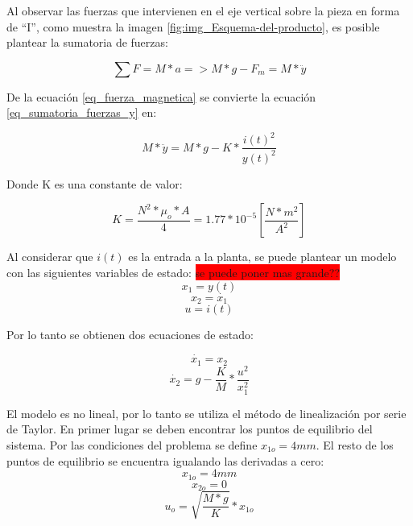 \noindent Al observar las fuerzas que intervienen en el eje vertical sobre la pieza en forma de ``I'', como muestra la imagen \ref{fig:img_Esquema-del-producto}, es posible plantear la sumatoria de fuerzas:

\begin{equation}\label{eq_sumatoria_fuerzas_y}
	\sum F=M*a=>M*g-F_{m}=M*\ddot{y}
\end{equation}

\noindent De la ecuación \ref{eq_fuerza_magnetica} se convierte la ecuación \ref{eq_sumatoria_fuerzas_y} en:

\begin{equation}\label{eq_sumatoria_fuerzas_y_2}
	M*\ddot{y}=M*g-K*\frac{i(t)^{2}}{y(t)^{2}}
\end{equation}

\noindent Donde K es una constante de valor:

\begin{equation}
	K=\frac{N^{2}*\mu_{o}*A}{4}=1.77*10^{-5} [\frac{N*m^2}{A^2}]
\end{equation}

\noindent Al considerar que $i(t)$ es la entrada a la planta, se puede plantear un modelo con las siguientes variables de estado:\newline
\colorbox{red}{se puede poner mas grande??}
\begin{equation}
	x_{1}=y(t)
\end{equation}
\begin{equation}
	x_{2}=\dot{x_{1}}
\end{equation}
\begin{equation}
	u=i(t)
\end{equation}

\noindent Por lo tanto se obtienen dos ecuaciones de estado:

\begin{equation}
	\dot{x_{1}}=x_{2}
\end{equation}
\begin{equation}
	\dot{x_{2}}=g-\frac{K}{M}*\frac{u^{2}}{x_{1}^{2}}
\end{equation}

\noindent El modelo es no lineal, por lo tanto se utiliza el método de linealización por serie de Taylor. En primer lugar se deben encontrar los puntos de equilibrio del sistema. Por las condiciones del problema se define $x_{1o}=4mm$. El resto de los puntos de equilibrio se encuentra igualando las derivadas a cero:
\begin{equation}
	x_{1o}=4mm
\end{equation}
\begin{equation}
	x_{2o}=0
\end{equation}
\begin{equation}
	u_{o}=\sqrt{\frac{M*g}{K}}*x_{1o}
\end{equation}

